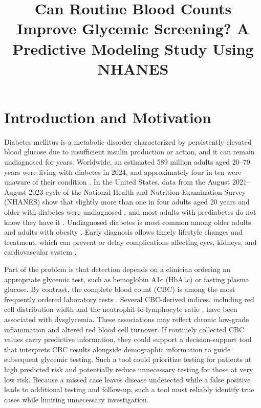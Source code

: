 \documentclass[conference]{IEEEtran}
\title{Can Routine Blood Counts Improve Glycemic Screening? A Predictive Modeling Study Using NHANES}
\author{
\IEEEauthorblockN{Hamid Saeed\textsuperscript{1}, Setayesh Afshar\textsuperscript{1}, Jacob Kraft\textsuperscript{1}, Emmanuella Osifo\textsuperscript{1}, Ahenkan Yeboah\textsuperscript{1}}
\IEEEauthorblockA{\textsuperscript{1}Department of Biomedical Engineering, University of Calgary, Calgary, AB, Canada}
}
\begin{document}
\maketitle

\section{Introduction and Motivation}



Diabetes mellitus is a metabolic disorder characterized by persistently elevated blood glucose due to insufficient insulin production or action, and it can remain undiagnosed for years. Worldwide, an estimated 589 million adults aged 20--79 years were living with diabetes in 2024, and approximately four in ten were unaware of their condition \cite{idf2025}. In the United States, data from the August 2021--August 2023 cycle of the National Health and Nutrition Examination Survey (NHANES) show that slightly more than one in four adults aged 20 years and older with diabetes were undiagnosed \cite{gwira2024}, and most adults with prediabetes do not know they have it \cite{cdc2026}. Undiagnosed diabetes is most common among older adults and adults with obesity \cite{gwira2024}. Early diagnosis allows timely lifestyle changes and treatment, which can prevent or delay complications affecting eyes, kidneys, and cardiovascular system \cite{idf2025}.


Part of the problem is that detection depends on a clinician ordering an appropriate glycemic test, such as hemoglobin A1c (HbA1c) or fasting plasma glucose. By contrast, the complete blood count (CBC) is among the most frequently ordered laboratory tests \cite{horton2019}. Several CBC-derived indices, including red cell distribution width \cite{veeranna2012} and the neutrophil-to-lymphocyte ratio \cite{mertoglu2017}, have been associated with dysglycemia. These associations may reflect chronic low-grade inflammation and altered red blood cell turnover. If routinely collected CBC values carry predictive information, they could support a decision-support tool that interprets CBC results alongside demographic information to guide subsequent glycemic testing. Such a tool could prioritize testing for patients at high predicted risk and potentially reduce unnecessary testing for those at very low risk. Because a missed case leaves disease undetected while a false positive leads to additional testing and follow-up, such a tool must reliably identify true cases while limiting unnecessary investigation.
\end{document}
